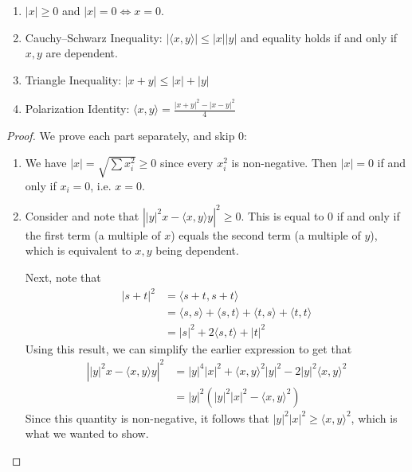 \begin{itemize}
\begin{proposition}
\begin{enumerate}
            \item $|x| \ge 0$ and $|x|=0 \iff x=0$.
            \item Cauchy–Schwarz Inequality: $|\langle x,y\rangle| \le |x||y|$ and equality holds if and only if $x,y$ are dependent.
            \item Triangle Inequality: $|x+y| \le |x|+|y|$
            \item Polarization Identity: $\langle x,y\rangle = \frac{|x+y|^2-|x-y|^2}{4}$
        \end{enumerate}
    \end{proposition}
    \begin{proof}
        We prove each part separately, and skip $0$:
        \begin{enumerate}
            \item We have $|x|=\sqrt{\sum x_i^2} \ge 0$ since every $x_i^2$ is non-negative. Then $|x|=0$ if and only if $x_i=0$, i.e. $x=0$.
            \item Consider and note that $\left||y|^2x - \langle x,y\rangle y\right|^2 \ge 0.$ This is equal to $0$ if and only if the first term (a multiple of $x$) equals the second term (a multiple of $y$), which is equivalent to $x,y$ being dependent.
            
            Next, note that
            \begin{align}
                |s+t|^2 &= \langle s+t, s+t\rangle \\ 
                &= \langle s,s\rangle +\langle s,t\rangle + \langle t,s\rangle + \langle t,t\rangle \\ 
                &= |s|^2 + 2\langle s,t\rangle + |t|^2
            \end{align}
            Using this result, we can simplify the earlier expression to get that
            \begin{align}
                \left||y|^2x - \langle x,y\rangle y\right|^2 &= |y|^4 |x|^2 + \langle x,y\rangle^2|y|^2 - 2|y|^2 \langle x,y\rangle^2 \\ 
                &= |y|^2 (|y|^2|x|^2 - \langle x,y\rangle^2)
            \end{align}
            Since this quantity is non-negative, it follows that $|y|^2|x|^2 \ge \langle x,y\rangle^2$, which is what we wanted to show.
        \end{enumerate}
    \end{proof}
\end{itemize}